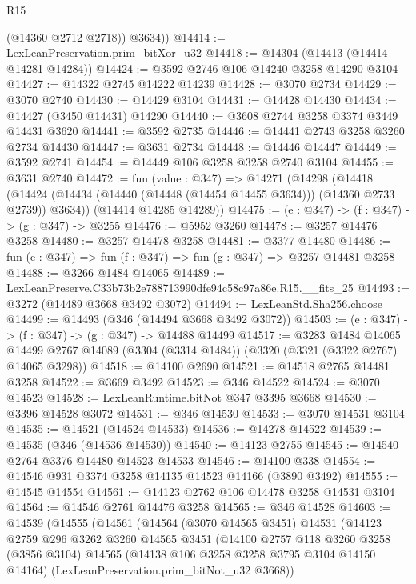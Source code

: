 \begin{lexlean}{R15}
\begin{coremodule}
          (@14360 @2712 @2718))
        @3634))
@14414 := LexLeanPreservation.prim_bitXor_u32
@14418 := @14304 (@14413 (@14414 @14281 @14284))
@14424 := @3592 @2746 @106 @14240 @3258 @14290 @3104
@14427 := @14322 @2745 @14222 @14239
@14428 := @3070 @2734
@14429 := @3070 @2740
@14430 := @14429 @3104
@14431 := @14428 @14430
@14434 := @14427 (@3450 @14431) @14290
@14440 := @3608 @2744 @3258 @3374 @3449 @14431 @3620
@14441 := @3592 @2735
@14446 := @14441 @2743 @3258 @3260 @2734 @14430
@14447 := @3631 @2734
@14448 := @14446 @14447
@14449 := @3592 @2741
@14454 := @14449 @106 @3258 @3258 @2740 @3104
@14455 := @3631 @2740
@14472 := fun (value : @347) =>
  @14271
    (@14298
      (@14418 (@14424 (@14434 (@14440 (@14448 (@14454 @14455 @3634))) (@14360 @2733 @2739)) @3634))
      (@14414 @14285 @14289))
@14475 := (e : @347) -> (f : @347) -> (g : @347) -> @3255
@14476 := @5952 @3260
@14478 := @3257 @14476 @3258
@14480 := @3257 @14478 @3258
@14481 := @3377 @14480
@14486 := fun (e : @347) => fun (f : @347) => fun (g : @347) => @3257 @14481 @3258
@14488 := @3266 @1484 @14065
@14489 := LexLeanPreserve.C33b73b2e788713990dfe94c58c97a86e.R15.__fits_25
@14493 := @3272 (@14489 @3668 @3492 @3072)
@14494 := LexLeanStd.Sha256.choose
@14499 := @14493 (@346 (@14494 @3668 @3492 @3072))
@14503 := (e : @347) -> (f : @347) -> (g : @347) -> @14488 @14499
@14517 := @3283
    @1484
    @14065
    @14499
    @2767
    @14089
    (@3304 (@3314 @1484))
    (@3320 (@3321 (@3322 @2767) @14065 @3298))
@14518 := @14100 @2690
@14521 := @14518 @2765 @14481 @3258
@14522 := @3669 @3492
@14523 := @346 @14522
@14524 := @3070 @14523
@14528 := LexLeanRuntime.bitNot @347 @3395 @3668
@14530 := @3396 @14528 @3072
@14531 := @346 @14530
@14533 := @3070 @14531 @3104
@14535 := @14521 (@14524 @14533)
@14536 := @14278 @14522
@14539 := @14535 (@346 (@14536 @14530))
@14540 := @14123 @2755
@14545 := @14540 @2764 @3376 @14480 @14523 @14533
@14546 := @14100 @338
@14554 := @14546 @931 @3374 @3258 @14135 @14523 @14166 (@3890 @3492)
@14555 := @14545 @14554
@14561 := @14123 @2762 @106 @14478 @3258 @14531 @3104
@14564 := @14546 @2761 @14476 @3258
@14565 := @346 @14528
@14603 := @14539
    (@14555
      (@14561
        (@14564
          (@3070 @14565 @3451)
          @14531
          (@14123
            @2759
            @296
            @3262
            @3260
            @14565
            @3451
            (@14100
              @2757
              @118
              @3260
              @3258
              (@3856 @3104)
              @14565
              (@14138 @106 @3258 @3258 @3795 @3104 @14150 @14164)
              (LexLeanPreservation.prim_bitNot_u32 @3668))

\end{coremodule}
\end{lexlean}
